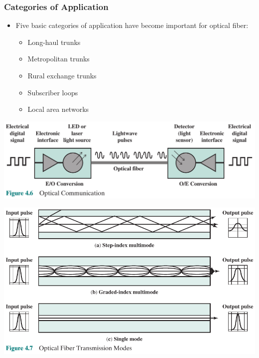 \documentclass[pdflatex,compress]{beamer}
\begin{document}
\begin{frame}
	\frametitle{Categories of Application}
	\begin{itemize}
		\item Five basic categories of application have become important for optical fiber:
		\begin{itemize}
			\item Long-haul trunks
			\item Metropolitan trunks
			\item Rural exchange trunks
			\item Subscriber loops
			\item Local area networks
		\end{itemize}
	\end{itemize}
\end{frame}

\begin{frame}
	\begin{center}
		\includegraphics[width=\linewidth]{img/img14}
	\end{center}
\end{frame}

\begin{frame}
	\begin{center}
		\includegraphics[width=\linewidth]{img/img15}
	\end{center}
\end{frame}
\end{document}
